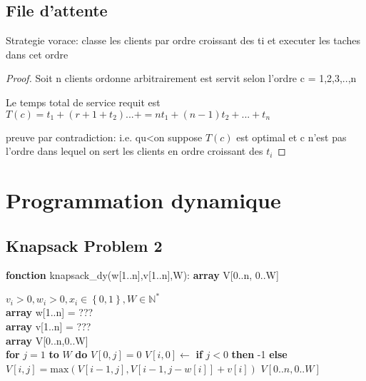\documentclass{article}
\theoremstyle{definition}
\theoremstyle{remark}
\newcommand{\pr}[1]{\left( #1 \right)}
\begin{document}
    \subsection{File d'attente}
    Strategie vorace: classe les clients par ordre croissant des ti et executer les taches dans cet ordre
    \begin{proof}
        Soit n clients ordonne arbitrairement est servit selon l'ordre
        c = 1,2,3,..,n
        
        Le temps total de service requit est $T\pr{c} = t_1+ \pr{r+1+t_2}...+ = nt_1 + \pr{n-1}t_2 +...+ t_n$

        preuve par contradiction: i.e. qu<on suppose $T\pr{c}$ est optimal et c n'est pas l'ordre
        dans lequel on sert les clients en ordre croissant des $t_i$
    \end{proof}

\section{Programmation dynamique}
\subsection{Knapsack Problem 2}
    \begin{algorithm} 
	\caption{\textbf{fonction} knapsack\_dy(w[1..n],v[1..n],W): \textbf{array} V[0..n, 0..W]
} 
	\label{alg_sacados2} 
	\begin{algorithmic}
		\REQUIRE $v_{i} > 0, w_{i} > 0, x_{i} \in \left\{ 0,1 \right\}, W \in \mathbb{N}^{*} $ \\
		\textbf{array} w[1..n] = ??? \\
		\textbf{array} v[1..n] = ???\\ 
		\textbf{array} V[0..n,0..W]\\ 
		\textbf{for} $j = 1$ \textbf{to} $W$ \textbf{do} $V\left[ 0,j \right] = 0$
		\STATE $V[i,0] \gets$ \textbf{if} $j<0 $ \textbf{then} -1 
		\STATE \qquad\qquad\;\textbf{else} $V\left[ i,j \right] = \text{max}\left( V[i-1,j], V[i-1,j-w[i]] + v[i] \right) $
		\ENDFOR
		\ENDFOR
		\RETURN $V[0..n,0..W]$
	\end{algorithmic} 
\end{algorithm}
    
\end{document}
